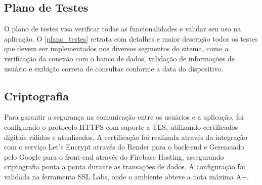 \documentclass[
	article,			%
	12pt,				%
	oneside,			%
	a4paper,			%
    BIBLATEX,           %
	english,			%
	brazil,				%
	sumario=tradicional
	]{abntex2}
\begin{document}
\renewcommand{\arraystretch}{1.5} %

\subsection{Plano de Testes}

O plano de testes visa verificar todas as funcionalidades e validar seu uso na aplicação. O \autoref{plano_testes} retrata com detalhes e maior descrição todos os testes que devem ser implementados nos diversos segmentos do sitema, como a verificação da conexão com o banco de dados, validação de informações de usuário e exibição correta de consultas conforme a data do dispositivo.

\subsection{Criptografia}

Para garantir a segurança na comunicação entre os usuários e a aplicação, foi configurado o protocolo HTTPS com suporte a TLS, utilizando certificados digitais válidos e atualizados. A certificação foi realizada através da integração com o serviço Let's Encrypt através do Render para o back-end e Gerenciado pelo Google para o front-end através do Firebase Hosting, assegurando criptografia ponta a ponta durante as transações de dados. A configuração foi validada na ferramenta SSL Labs, onde o ambiente obteve a nota máxima A+.
\end{document}
